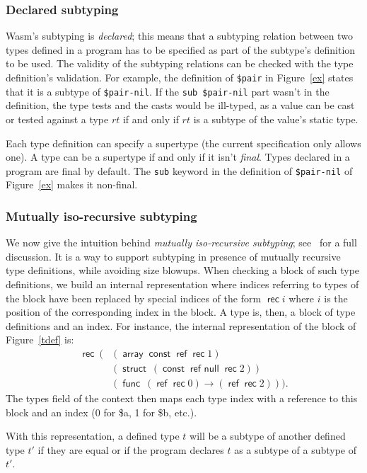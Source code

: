 \documentclass[a4paper,11pt]{article}
\DeclareMathOperator{\reft}{\textsf{ref}}
\DeclareMathOperator{\rect}{\textsf{rec}}
\DeclareMathOperator{\strt}{\textsf{struct}}
\DeclareMathOperator{\arrt}{\textsf{array}}
\DeclareMathOperator{\funt}{\textsf{func}}
\DeclareMathOperator{\cstt}{\textsf{const}}
\DeclareMathOperator{\refnullt}{\textsf{ref null}}
\begin{document}
\subsubsection{Declared subtyping}
Wasm's subtyping is \emph{declared}; this means that a subtyping relation
between two types defined in a program has to be specified as part of the
subtype's definition to be used. The validity of the subtyping relations can be
checked with the type definition's validation. For example, the definition of
\texttt{\$pair} in Figure~\ref{ex} states that it is a subtype of
\texttt{\$pair-nil}. If the \texttt{sub \$pair-nil} part wasn't in the
definition, the type tests and the casts would be ill-typed, as a value can be
cast or tested against a type $rt$ if and only if $rt$ is a subtype of the
value's static type.

Each type definition can specify a supertype (the current specification only
allows one). A type can be a supertype if and only if it isn't \emph{final}.
Types declared in a program are final by default. The \texttt{sub} keyword in
the definition of \texttt{\$pair-nil} of Figure~\ref{ex} makes it non-final.

\subsubsection{Mutually iso-recursive subtyping}\label{deft}
We now give the intuition behind \emph{mutually iso-recursive subtyping};
see~\cite{rossberg2023mutually} for a full discussion. It is a way to support
subtyping in presence of mutually recursive type definitions, while avoiding
size blowups. When checking a block of such type definitions, we build an
internal representation where indices referring to types of the block have been
replaced by special indices of the form $\rect i$ where $i$ is the position of
the corresponding index in the block. A type is, then, a block of type
definitions and an index. For instance, the internal representation of the block
of Figure~\ref{tdef} is:
\begin{align*}
\rect\ (& (\arrt \cstt\reft \rect 1)\\
&(\strt\ (\cstt \refnullt \rect 2))\\
&(\funt\ (\reft \rect 0)\to (\reft \rect 2))).
\end{align*}
The \textsf{types} field of the context then maps each type index with a
reference to this block and an index (0 for \textsf{\$a}, 1 for \textsf{\$b},
etc.).

With this representation, a defined type $t$ will be a subtype of another
defined type $t'$ if they are equal or if the program declares $t$ as a subtype
of a subtype of $t'$.
\end{document}
